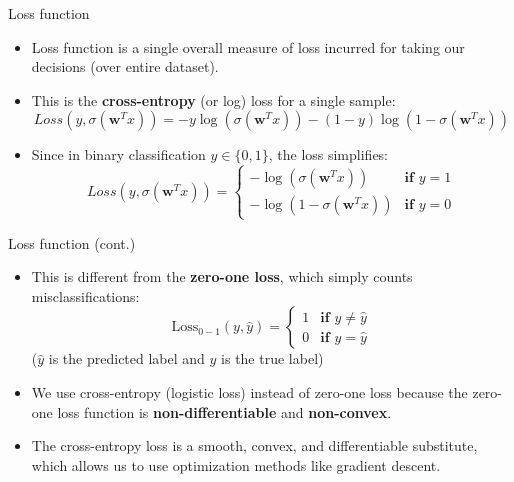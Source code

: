 \documentclass[serif, aspectratio=169]{beamer}
\begin{document}

    \begin{frame}{Loss function}
        \begin{itemize}
            \item Loss function is a single overall measure of loss incurred for taking our decisions (over entire dataset).
            \item This is the \textbf{cross-entropy} (or log) loss for a single sample:
            \[ Loss(y, \sigma (\mathbf{w}^T x)) = -y \log (\sigma ( \mathbf{w}^T x)) - (1-y) \log
            (1 - \sigma (\mathbf{w}^T x))
            \]

            \item Since in binary classification $y \in \{0, 1\}$, the loss simplifies:
            \[
                Loss(y, \sigma (\mathbf{w}^T x)) = \begin{cases}
                                                       - \log (\sigma (\mathbf{w}^T x)) & \textbf{if } y = 1 \\
                                                       - \log (1 - \sigma (\mathbf{w}^T x)) & \textbf{if } y = 0
                \end{cases}
            \]
        \end{itemize}
    \end{frame}
    \begin{frame}{Loss function (cont.)}
        \begin{itemize}
            \item This is different from the \textbf{zero-one loss}, which simply counts misclassifications:
            \[
                \text{Loss}_{0-1}(y, \hat{y}) =  \begin{cases}
                                                     1 & \textbf{if } y \neq \hat{y} \\
                                                     0 & \textbf{if } y = \hat{y}
                \end{cases}
            \]
            ($\hat{y}$ is the predicted label and $y$ is the true label)

            \item We use cross-entropy (logistic loss) instead of zero-one loss because the zero-one loss function is \textbf{non-differentiable} and \textbf{non-convex}.

            \item The cross-entropy loss is a smooth, convex, and differentiable substitute, which allows us to use optimization methods like gradient descent.
        \end{itemize}
    \end{frame}
\end{document}
